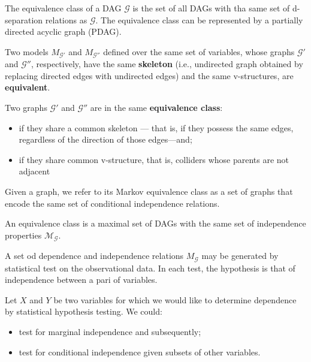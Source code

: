The equivalence class of a DAG $\mathcal{G}$ is the set of all DAGs with tha same
set of d-separation relations as $\mathcal{G}$. The equivalence class can be represented
by a partially directed acyclic graph (PDAG).

\begin{definition}
    Two models $M_\mathcal{G'}$ and $M_\mathcal{G''}$ defined over the same set
    of variables, whose graphs $\mathcal{G'}$ and $\mathcal{G''}$, respectively,
    have the same \textbf{skeleton} (i.e., undirected graph obtained by replacing
    directed edges with undirected edges) and the same v-structures, are \textbf{equivalent}.

    Two graphs $\mathcal{G'}$ and $\mathcal{G''}$ are in the same \textbf{equivalence class}:
    \begin{itemize}
        \item if they share a common skeleton — that is, if they possess the same
              edges, regardless of the direction of those edges—and;
        \item if they share common v-structure, that is, colliders whose parents
              are not adjacent
    \end{itemize}
\end{definition}

Given a graph, we refer to its Markov equivalence class as a set of graphs that
encode the same set of conditional independence relations.

\begin{definition}
    An equivalence class is a maximal set of DAGs with the same set of independence
    properties $\mathcal{M}_{\mathcal{G}}$.
\end{definition}

A set od dependence and independence relations $M_{\mathcal{G}}$ may be generated
by statistical test on the observational data. In each test, the hypothesis is
that of independence between a pari of variables.

Let $X$ and $Y$ be two variables for which we would like to determine dependence
by statistical hypothesis testing. We could:
\begin{itemize}
    \item test for marginal independence and subsequently;
    \item test for conditional independence given subsets of other variables.
\end{itemize}
